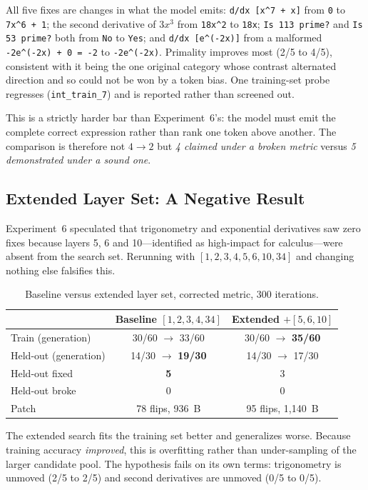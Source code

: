 \documentclass[11pt,a4paper]{article}
\begin{document}
All five fixes are changes in what the model emits:
\verb|d/dx [x^7 + x]| from \texttt{0} to \verb|7x^6 + 1|; the second derivative of
$3x^3$ from \verb|18x^2| to \verb|18x|; \texttt{Is 113 prime?} and
\texttt{Is 53 prime?} both from \texttt{No} to \texttt{Yes}; and
\verb|d/dx [e^(-2x)]| from a malformed \verb|-2e^(-2x) + 0 = -2| to
\verb|-2e^(-2x)|. Primality improves most (2/5 to 4/5), consistent with it being
the one original category whose contrast alternated direction and so could not be
won by a token bias. One training-set probe regresses (\texttt{int\_train\_7}) and
is reported rather than screened out.

This is a strictly harder bar than Experiment~6's: the model must emit the
complete correct expression rather than rank one token above another. The
comparison is therefore not $4 \to 2$ but \emph{4 claimed under a broken metric}
versus \emph{5 demonstrated under a sound one}.

\subsection{Extended Layer Set: A Negative Result}

Experiment~6 speculated that trigonometry and exponential derivatives saw zero
fixes because layers 5, 6 and 10---identified as high-impact for calculus---were
absent from the search set. Rerunning with $[1,2,3,4,5,6,10,34]$ and changing
nothing else falsifies this.

\begin{table}[h]
\centering
\caption{Baseline versus extended layer set, corrected metric, 300 iterations.}
\begin{tabular}{lcc}
\toprule
 & Baseline $[1,2,3,4,34]$ & Extended $+[5,6,10]$ \\
\midrule
Train (generation) & 30/60 $\to$ 33/60 & 30/60 $\to$ \textbf{35/60} \\
Held-out (generation) & 14/30 $\to$ \textbf{19/30} & 14/30 $\to$ 17/30 \\
Held-out fixed & \textbf{5} & 3 \\
Held-out broke & 0 & 0 \\
Patch & 78 flips, 936~B & 95 flips, 1{,}140~B \\
\bottomrule
\end{tabular}
\end{table}

The extended search fits the training set better and generalizes worse. Because
training accuracy \emph{improved}, this is overfitting rather than under-sampling
of the larger candidate pool. The hypothesis fails on its own terms: trigonometry
is unmoved (2/5 to 2/5) and second derivatives are unmoved (0/5 to 0/5).
\end{document}
